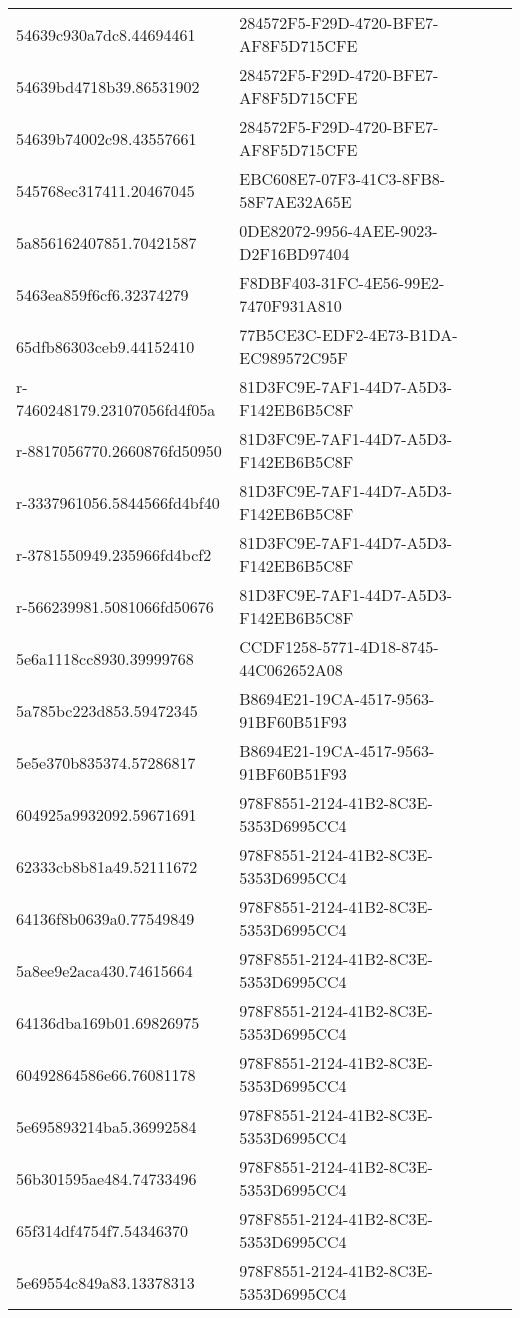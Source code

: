 \begin{tabular}{ll}
54639c930a7dc8.44694461 & 284572F5-F29D-4720-BFE7-AF8F5D715CFE \\
54639bd4718b39.86531902 & 284572F5-F29D-4720-BFE7-AF8F5D715CFE \\
54639b74002c98.43557661 & 284572F5-F29D-4720-BFE7-AF8F5D715CFE \\
545768ec317411.20467045 & EBC608E7-07F3-41C3-8FB8-58F7AE32A65E \\
5a856162407851.70421587 & 0DE82072-9956-4AEE-9023-D2F16BD97404 \\
5463ea859f6cf6.32374279 & F8DBF403-31FC-4E56-99E2-7470F931A810 \\
65dfb86303ceb9.44152410 & 77B5CE3C-EDF2-4E73-B1DA-EC989572C95F \\
r-7460248179.23107056fd4f05a & 81D3FC9E-7AF1-44D7-A5D3-F142EB6B5C8F \\
r-8817056770.2660876fd50950 & 81D3FC9E-7AF1-44D7-A5D3-F142EB6B5C8F \\
r-3337961056.5844566fd4bf40 & 81D3FC9E-7AF1-44D7-A5D3-F142EB6B5C8F \\
r-3781550949.235966fd4bcf2 & 81D3FC9E-7AF1-44D7-A5D3-F142EB6B5C8F \\
r-566239981.5081066fd50676 & 81D3FC9E-7AF1-44D7-A5D3-F142EB6B5C8F \\
5e6a1118cc8930.39999768 & CCDF1258-5771-4D18-8745-44C062652A08 \\
5a785bc223d853.59472345 & B8694E21-19CA-4517-9563-91BF60B51F93 \\
5e5e370b835374.57286817 & B8694E21-19CA-4517-9563-91BF60B51F93 \\
604925a9932092.59671691 & 978F8551-2124-41B2-8C3E-5353D6995CC4 \\
62333cb8b81a49.52111672 & 978F8551-2124-41B2-8C3E-5353D6995CC4 \\
64136f8b0639a0.77549849 & 978F8551-2124-41B2-8C3E-5353D6995CC4 \\
5a8ee9e2aca430.74615664 & 978F8551-2124-41B2-8C3E-5353D6995CC4 \\
64136dba169b01.69826975 & 978F8551-2124-41B2-8C3E-5353D6995CC4 \\
60492864586e66.76081178 & 978F8551-2124-41B2-8C3E-5353D6995CC4 \\
5e695893214ba5.36992584 & 978F8551-2124-41B2-8C3E-5353D6995CC4 \\
56b301595ae484.74733496 & 978F8551-2124-41B2-8C3E-5353D6995CC4 \\
65f314df4754f7.54346370 & 978F8551-2124-41B2-8C3E-5353D6995CC4 \\
5e69554c849a83.13378313 & 978F8551-2124-41B2-8C3E-5353D6995CC4 \\

\end{tabular}

